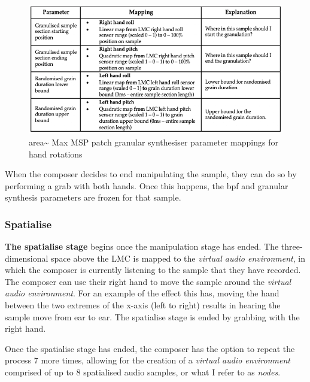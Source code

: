 \begin{figure}
    \centering
    \includegraphics[width=1\linewidth]{figures/05-area/areatechnical_param2.png}
    \caption{area\textasciitilde{} Max MSP patch granular synthesiser parameter mappings for hand rotations}
    \label{fig: areaparams2}
\end{figure}
When the composer decides to end manipulating the sample, they can do so by performing a grab with both hands. Once this happens, the \gls{bpf} and granular synthesis parameters are frozen for that sample.

\subsubsection{Spatialise}\label{sec: area-system-software-spatialise}
\textbf{The spatialise stage} begins once the manipulation stage has ended. The three-dimensional space above the LMC is mapped to the \textit{virtual audio environment}, in which the composer is currently listening to the sample that they have recorded. The composer can use their right hand to move the sample around the \textit{virtual audio environment}. For an example of the effect this has, moving the hand between the two extremes of the x-axis (left to right) results in hearing the sample move from ear to ear. The spatialise stage is ended by grabbing with the right hand.

Once the spatialise stage has ended, the composer has the option to repeat the process 7 more times, allowing for the creation of a \textit{virtual audio environment} comprised of up to 8 spatialised audio samples, or what I refer to as \textit{nodes}. 

